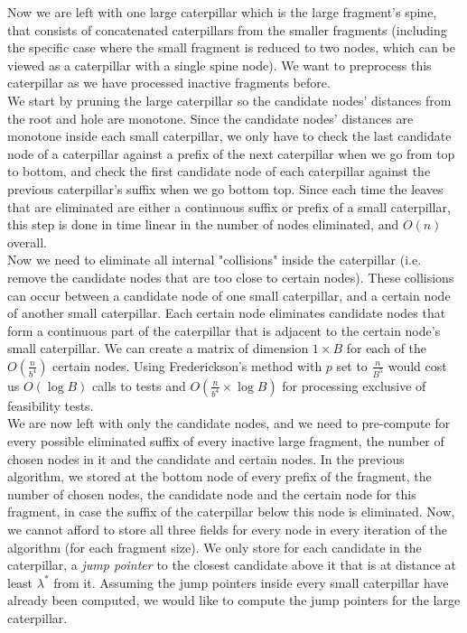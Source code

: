 \documentclass[11pt,a4paper]{article}
\theoremstyle{definition}
\theoremstyle{remark}
\begin{document}
Now we are left with one large caterpillar which is the large fragment's spine, that consists of concatenated caterpillars from the smaller fragments (including the specific case where the small fragment is reduced to two nodes, which can be viewed as a caterpillar with a single spine node). We want to preprocess this caterpillar as we have processed inactive fragments before.\\
We start by pruning the large caterpillar so the candidate nodes' distances from the root and hole are monotone. Since the candidate nodes' distances are monotone inside each small caterpillar, we only have to check the last candidate node of a caterpillar against a prefix of the next caterpillar when we go from top to bottom, and check the first candidate node of each caterpillar against the previous caterpillar's suffix when we go bottom top. Since each time the leaves that are eliminated are either a continuous suffix or prefix of a small caterpillar, this step is done in time linear in the number of nodes eliminated, and $O(n)$ overall.\\
Now we need to eliminate all internal "collisions" inside the caterpillar (i.e. remove the candidate nodes that are too close to certain nodes). These collisions can occur between a candidate node of one small caterpillar, and a certain node of another small caterpillar. Each certain node eliminates candidate nodes that form a continuous part of the caterpillar that is adjacent to the certain node's small caterpillar. We can create a matrix of dimension $1 \times B$ for each of the $O(\frac{n}{b^4})$ certain nodes. Using Frederickson's method with $p$ set to $\frac{n}{B^5}$ would cost us $O(\log B)$ calls to tests and $O(\frac{n}{b^4} \times \log B)$ for processing exclusive of feasibility tests.\\
We are now left with only the candidate nodes, and we need to pre-compute for every possible eliminated suffix of every inactive large fragment, the number of chosen nodes in it and the candidate and certain nodes. In the previous algorithm, we stored at the bottom node of every prefix of the fragment, the number of chosen nodes, the candidate node and the certain node for this fragment, in case the suffix of the caterpillar below this node is eliminated. Now, we cannot afford to store all three fields for every node in every iteration of the algorithm (for each fragment size). We only store for each candidate in the caterpillar, a \emph{jump pointer} to the closest candidate above it that is at distance at least $\lambda ^*$ from it. Assuming the jump pointers inside every small caterpillar have already been computed, we would like to compute the jump pointers for the large caterpillar.\\
\end{document}
